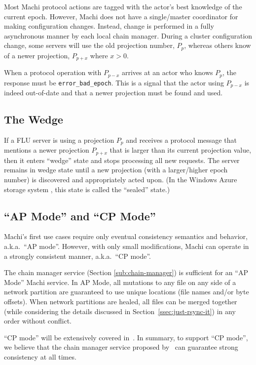 \documentclass[preprint,10pt]{sigplanconf}
\begin{document}
Most Machi protocol actions are tagged with the actor's best knowledge
of the current epoch.  However, Machi does not have a single/master
coordinator for making configuration changes.  Instead, change is
performed in a fully asynchronous manner by
each local chain manager.  During a cluster
configuration change, some servers will use the old projection number,
$P_p$, whereas others know of a newer projection, $P_{p+x}$ where $x>0$.

When a protocol operation with $P_{p-x}$ arrives at an actor who knows
$P_p$, the response must be {\tt error\_bad\_epoch}.  This is a signal
that the actor using $P_{p-x}$ is indeed out-of-date and that a newer
projection must be found and used.

\subsection{The Wedge}
\label{sub:wedge}

If a FLU server is using a projection $P_p$ and receives a protocol
message that mentions a newer projection $P_{p+x}$ that is larger than its
current projection value, then it enters ``wedge'' state and stops
processing all new requests.  The server remains in wedge state until
a new projection (with a larger/higher epoch number) is discovered and
appropriately acted upon.
(In the Windows Azure storage system \cite{was}, this state is called
the ``sealed'' state.)

\subsection{``AP Mode'' and ``CP Mode''}
\label{sub:ap-cp-mode}

Machi's first use cases require only eventual consistency semantics
and behavior, a.k.a.~``AP mode''.  However, with only small
modifications, Machi can operate in a strongly consistent manner,
a.k.a.~``CP mode''.

The chain manager service (Section \ref{sub:chain-manager}) is
sufficient for an ``AP Mode'' Machi service.  In AP Mode, all mutations
to any file on any side of a network partition are guaranteed to use
unique locations (file names and/or byte offsets).  When network
partitions are healed, all files can be merged together
(while considering the details discussed in
Section~\ref{ssec:just-rsync-it}) in any order
without conflict.

``CP mode'' will be extensively covered in~\cite{machi-chain-manager-design}.
In summary, to support ``CP mode'', we believe that the chain manager
service proposed by~\cite{machi-chain-manager-design} can guarantee
strong consistency at all times.
\end{document}
